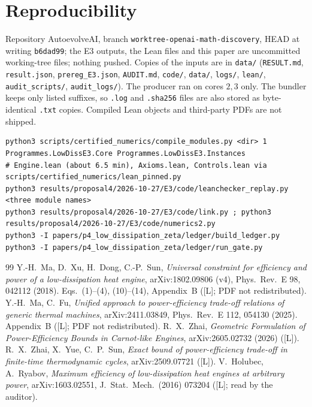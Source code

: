 \documentclass[10pt]{article}
\newcommand{\tier}[1]{\textsf{[#1]}}
\newcommand{\tL}{\tier{L}}
\theoremstyle{plain}
\begin{document}
\section{Reproducibility}\label{sec:repro}
Repository AutoevolveAI, branch \texttt{worktree-openai-math-discovery}, HEAD at writing \texttt{b6dad99}; the E3 outputs, the Lean files and this paper are uncommitted working-tree files; nothing pushed. Copies of the inputs are in \texttt{data/} (\texttt{RESULT.md}, \texttt{result.json}, \texttt{prereg\_E3.json}, \texttt{AUDIT.md}, \texttt{code/}, \texttt{data/}, \texttt{logs/}, \texttt{lean/}, \texttt{audit\_scripts/}, \texttt{audit\_logs/}). The producer ran on cores $2,3$ only. The bundler keeps only listed suffixes, so \texttt{.log} and \texttt{.sha256} files are also stored as byte-identical \texttt{.txt} copies. Compiled Lean objects and third-party PDFs are not shipped.
\begin{lstlisting}[basicstyle=\ttfamily\scriptsize]
python3 scripts/certified_numerics/compile_modules.py <dir> 1 Programmes.LowDissE3.Core Programmes.LowDissE3.Instances
# Engine.lean (about 6.5 min), Axioms.lean, Controls.lean via scripts/certified_numerics/lean_pinned.py
python3 results/proposal4/2026-10-27/E3/code/leanchecker_replay.py <three module names>
python3 results/proposal4/2026-10-27/E3/code/link.py ; python3 results/proposal4/2026-10-27/E3/code/numerics2.py
python3 -I papers/p4_low_dissipation_zeta/ledger/build_ledger.py
python3 -I papers/p4_low_dissipation_zeta/ledger/run_gate.py
\end{lstlisting}

\begin{thebibliography}{99}\small
{} Y.-H.\ Ma, D.\ Xu, H.\ Dong, C.-P.\ Sun, \emph{Universal constraint for efficiency and power of a low-dissipation heat engine}, arXiv:1802.09806 (v4), Phys.\ Rev.\ E 98, 042112 (2018). Eqs.\ (1)--(4), (10)--(14), Appendix~B (\tL; PDF not redistributed).
 Y.-H.\ Ma, C.\ Fu, \emph{Unified approach to power-efficiency trade-off relations of generic thermal machines}, arXiv:2411.03849, Phys.\ Rev.\ E 112, 054130 (2025). Appendix~B (\tL; PDF not redistributed).
 R.\ X.\ Zhai, \emph{Geometric Formulation of Power-Efficiency Bounds in Carnot-like Engines}, arXiv:2605.02732 (2026) (\tL).
 R.\ X.\ Zhai, X.\ Yue, C.\ P.\ Sun, \emph{Exact bound of power-efficiency trade-off in finite-time thermodynamic cycles}, arXiv:2509.07721 (\tL).
 V.\ Holubec, A.\ Ryabov, \emph{Maximum efficiency of low-dissipation heat engines at arbitrary power}, arXiv:1603.02551, J.\ Stat.\ Mech.\ (2016) 073204 (\tL; read by the auditor).
\end{thebibliography}
\end{document}
